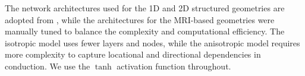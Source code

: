 The network architectures used for the 1D and 2D structured geometries are adopted from \cite{EP-PINNs}, while the architectures for the MRI-based geometries were manually tuned to balance the complexity and computational efficiency. The isotropic model uses fewer layers and nodes, while the anisotropic model requires more complexity to capture locational and directional dependencies in conduction. We use the $\tanh$ activation function throughout.
\begin{table}[ht]
\centering
\caption{Hyperparameter settings by experiment}
\label{table:hyperparameters}
\end{table}
